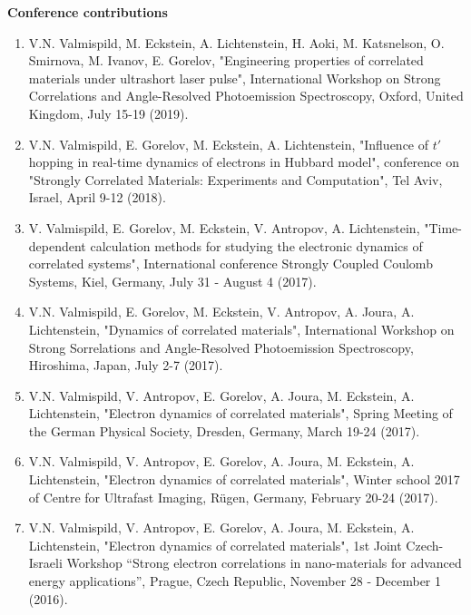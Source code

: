\documentclass[
12pt, %
english, %
singlespacing, %
liststotoc, %
headsepline, %
]{MastersDoctoralThesis} %
\numberwithin{equation}{section}
\begin{document}
\begin{listofpub}
\textbf{Conference contributions}
    \begin{enumerate}
    \item V.N. Valmispild, M. Eckstein, A. Lichtenstein, H. Aoki, M. Katsnelson, O. Smirnova, M. Ivanov, E. Gorelov, "Engineering properties of correlated materials under ultrashort laser pulse",  International Workshop on Strong Correlations and Angle-Resolved Photoemission Spectroscopy, Oxford, United Kingdom, July 15-19 (2019).
    \item V.N. Valmispild, E. Gorelov, M. Eckstein, A. Lichtenstein, "Influence of $t'$ hopping in real-time dynamics of electrons in Hubbard model", conference on "Strongly Correlated Materials: Experiments and
Computation", Tel Aviv, Israel, April 9-12 (2018).
    \item V. Valmispild, E. Gorelov, M. Eckstein, V. Antropov, A. Lichtenstein, "Time-dependent calculation methods for studying the electronic dynamics of correlated systems", International conference Strongly Coupled Coulomb Systems, Kiel, Germany, July 31 - August 4 (2017).
     \item V.N. Valmispild, E. Gorelov, M. Eckstein, V. Antropov, A. Joura, A. Lichtenstein, "Dynamics of correlated materials", International Workshop on Strong Sorrelations and Angle-Resolved Photoemission Spectroscopy, Hiroshima, Japan, July 2-7 (2017).
     \item V.N. Valmispild, V. Antropov, E. Gorelov, A. Joura, M. Eckstein, A. Lichtenstein, "Electron dynamics of correlated materials", Spring Meeting of the German Physical Society, Dresden, Germany, March 19-24 (2017).
    \item V.N. Valmispild, V. Antropov, E. Gorelov, A. Joura, M. Eckstein, A. Lichtenstein, "Electron dynamics of correlated materials", Winter school 2017 of Centre for Ultrafast Imaging, Rügen, Germany, February 20-24 (2017). 
     \item V.N. Valmispild, V. Antropov, E. Gorelov, A. Joura, M. Eckstein, A. Lichtenstein, "Electron dynamics of correlated materials", 1st Joint Czech-Israeli Workshop “Strong electron correlations in nano-materials for advanced energy applications”, Prague, Czech Republic, November 28 - December 1 (2016).

\end{enumerate}
\end{listofpub}
\end{document}
